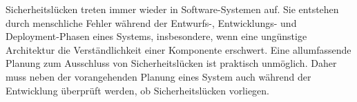 Sicherheitslücken treten immer wieder in Software-Systemen auf.
Sie entstehen durch menschliche Fehler während der Entwurfs-, Entwicklungs- und Deployment-Phasen eines Systems, insbesondere, wenn eine ungünstige Architektur die Verständlichkeit einer Komponente erschwert.
Eine allumfassende Planung zum Ausschluss von Sicherheitslücken ist praktisch unmöglich.
Daher muss neben der vorangehenden Planung eines System auch während der Entwicklung überprüft werden, ob Sicherheitslücken vorliegen.
